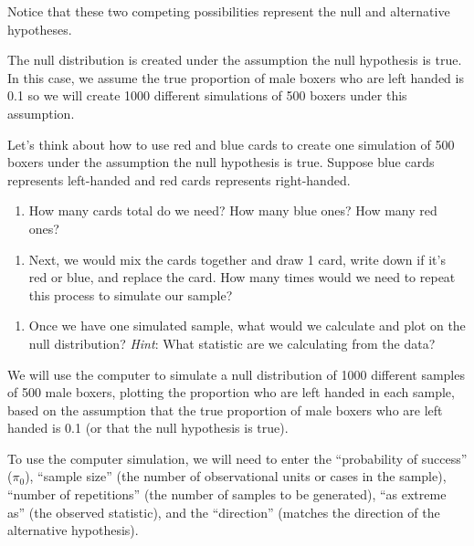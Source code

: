 \documentclass[
]{report}
\providecommand{\tightlist}{%
  \setlength{\itemsep}{0pt}\setlength{\parskip}{0pt}}
\begin{document}
Notice that these two competing possibilities represent the null and alternative hypotheses.

The null distribution is created under the assumption the null hypothesis is true. In this case, we assume the true proportion of male boxers who are left handed is 0.1 so we will create 1000 different simulations of 500 boxers under this assumption.

\newpage

Let's think about how to use red and blue cards to create one simulation of 500 boxers under the assumption the null hypothesis is true. Suppose blue cards represents left-handed and red cards represents right-handed.

\begin{enumerate}
\def\labelenumi{\arabic{enumi}.}
\setcounter{enumi}{13}
\tightlist
\item
  How many cards total do we need? How many blue ones? How many red ones?
\end{enumerate}

\vspace{0.5in}

\begin{enumerate}
\def\labelenumi{\arabic{enumi}.}
\setcounter{enumi}{14}
\tightlist
\item
  Next, we would mix the cards together and draw 1 card, write down if it's red or blue, and replace the card. How many times would we need to repeat this process to simulate our sample?
\end{enumerate}

\vspace{0.5in}

\begin{enumerate}
\def\labelenumi{\arabic{enumi}.}
\setcounter{enumi}{15}
\tightlist
\item
  Once we have one simulated sample, what would we calculate and plot on the null distribution? \emph{Hint}: What statistic are we calculating from the data?
\end{enumerate}

\vspace{1in}

We will use the computer to simulate a null distribution of 1000 different samples of 500 male boxers, plotting the proportion who are left handed in each sample, based on the assumption that the true proportion of male boxers who are left handed is 0.1 (or that the null hypothesis is true).

To use the computer simulation, we will need to enter the ``probability of success'' (\(\pi_0\)), ``sample size'' (the number of observational units or cases in the sample), ``number of repetitions'' (the number of samples to be generated), ``as extreme as'' (the observed statistic), and the ``direction'' (matches the direction of the alternative hypothesis).
\end{document}
